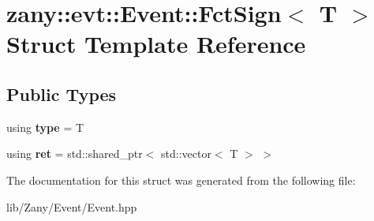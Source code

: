 \hypertarget{structzany_1_1evt_1_1_event_1_1_fct_sign}{}\section{zany\+:\+:evt\+:\+:Event\+:\+:Fct\+Sign$<$ T $>$ Struct Template Reference}
\label{structzany_1_1evt_1_1_event_1_1_fct_sign}
\subsection*{Public Types}
\begin{DoxyCompactItemize}
\item 
\mbox{\label{structzany_1_1evt_1_1_event_1_1_fct_sign_af3de1063a113ffd23176af375e30dce3}} 
using {\bfseries type} = T
\item 
\mbox{\label{structzany_1_1evt_1_1_event_1_1_fct_sign_ab8a8d498f45420f3372f88612793b9fe}} 
using {\bfseries ret} = std\+::shared\+\_\+ptr$<$ std\+::vector$<$ T $>$ $>$
\end{DoxyCompactItemize}


The documentation for this struct was generated from the following file\+:\begin{DoxyCompactItemize}
\item 
lib/\+Zany/\+Event/Event.\+hpp\end{DoxyCompactItemize}
